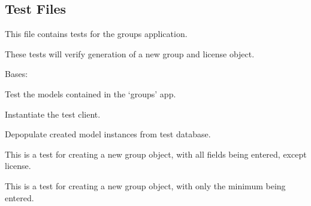 \documentclass[letterpaper,10pt,english]{sphinxmanual}
\begin{document}
\subsection{Test Files}
\label{api:id14}\label{api:module-groups.tests}
This file contains tests for the groups application.


These tests will verify generation of a new group and license object.


\begin{fulllineitems}
\label{api:groups.tests.GroupsModelTests}
Bases: 


Test the models contained in the `groups' app.


\begin{fulllineitems}
\label{api:groups.tests.GroupsModelTests.setUp}
Instantiate the test client.


\end{fulllineitems}


\begin{fulllineitems}
\label{api:groups.tests.GroupsModelTests.tearDown}
Depopulate created model instances from test database.


\end{fulllineitems}


\begin{fulllineitems}
\label{api:groups.tests.GroupsModelTests.test_create_group_all_fields}
This is a test for creating a new group object, with all fields being entered, except license.


\end{fulllineitems}


\begin{fulllineitems}
\label{api:groups.tests.GroupsModelTests.test_create_group_minimal}
This is a test for creating a new group object, with only the minimum being entered.



\end{fulllineitems}
\end{fulllineitems}
\end{document}

